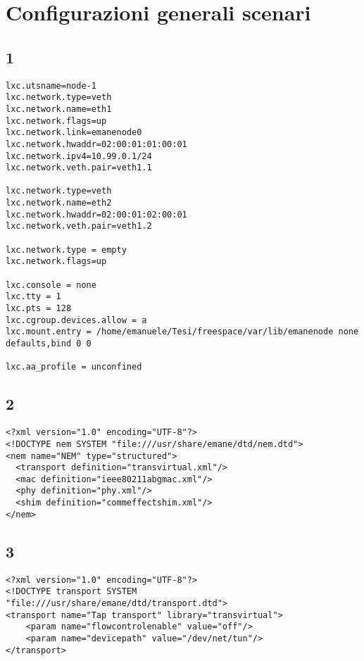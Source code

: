 \appendix
\chapter{Configurazioni generali scenari}
\label{app:a}


\section{1}
\label{app:conf_lxc_nodo1}

\lstset{language=BASH}
\begin{lstlisting}
lxc.utsname=node-1
lxc.network.type=veth
lxc.network.name=eth1
lxc.network.flags=up
lxc.network.link=emanenode0
lxc.network.hwaddr=02:00:01:01:00:01
lxc.network.ipv4=10.99.0.1/24
lxc.network.veth.pair=veth1.1

lxc.network.type=veth
lxc.network.name=eth2
lxc.network.hwaddr=02:00:01:02:00:01
lxc.network.veth.pair=veth1.2

lxc.network.type = empty
lxc.network.flags=up

lxc.console = none
lxc.tty = 1
lxc.pts = 128
lxc.cgroup.devices.allow = a
lxc.mount.entry = /home/emanuele/Tesi/freespace/var/lib/emanenode none defaults,bind 0 0

lxc.aa_profile = unconfined
\end{lstlisting}

\section{2}
\label{app:conf_nem}

\lstset{language=XML}
\begin{lstlisting}
<?xml version="1.0" encoding="UTF-8"?>
<!DOCTYPE nem SYSTEM "file:///usr/share/emane/dtd/nem.dtd">
<nem name="NEM" type="structured">
  <transport definition="transvirtual.xml"/>
  <mac definition="ieee80211abgmac.xml"/>
  <phy definition="phy.xml"/>
  <shim definition="commeffectshim.xml"/>
</nem>
\end{lstlisting}

\section{3}
\label{app:virtual_transport}

\lstset{language=XML}
\begin{lstlisting}
<?xml version="1.0" encoding="UTF-8"?>
<!DOCTYPE transport SYSTEM "file:///usr/share/emane/dtd/transport.dtd">
<transport name="Tap transport" library="transvirtual">
	<param name="flowcontrolenable" value="off"/>
	<param name="devicepath" value="/dev/net/tun"/>
</transport>
\end{lstlisting}


